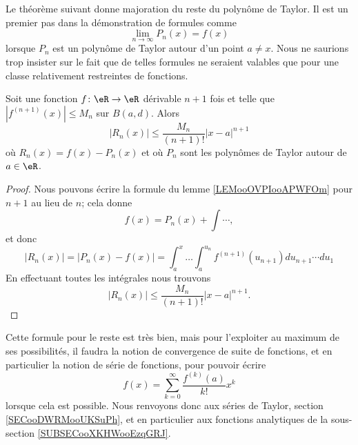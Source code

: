 Le théorème suivant donne majoration du reste du polynôme de Taylor. Il est un premier pas dans la démonstration de formules comme
\begin{equation}
	\lim_{n\to \infty} P_n(x)=f(x)
\end{equation}
lorsque \( P_n\) est un polynôme de Taylor autour d'un point \( a\neq x\). Nous ne saurions trop insister sur le fait que de telles formules ne seraient valables que pour une classe relativement restreintes de fonctions.
\begin{theorem}       \label{THOooEUVEooXZJTRL}
	Soit une fonction \( f\colon \eR\to \eR\) dérivable \( n+1\) fois et telle que \( | f^{(n+1)}(x) |\leq M_n\) sur \( B(a,d)\). Alors
	\begin{equation}
		| R_n(x) |\leq \frac{ M_n }{ (n+1)! }| x-a |^{n+1}
	\end{equation}
	où \( R_n(x)=f(x)-P_n(x)\) et où \( P_n\) sont les polynômes de Taylor autour de \( a\in \eR\).
\end{theorem}

\begin{proof}
	Nous pouvons écrire la formule du lemme \ref{LEMooOVPIooAPWFOm} pour \( n+1\) au lieu de \( n\); cela donne
	\begin{equation}
		f(x)=P_n(x)+\int\cdots,
	\end{equation}
	et donc
	\begin{equation}
		| R_n(x) |=| P_n(x)-f(x) |=\int_a^x\ldots\int_a^{u_n}f^{(n+1)}(u_{n+1})du_{n+1}\cdots du_{1}
	\end{equation}
	En effectuant toutes les intégrales nous trouvons
	\begin{equation}
		| R_n(x) |\leq \frac{ M_n }{ (n+1)! }| x-a |^{n+1}.
	\end{equation}
\end{proof}
Cette formule pour le reste est très bien, mais pour l'exploiter au maximum de ses possibilités, il faudra la notion de convergence de suite de fonctions, et en particulier la notion de série de fonctions, pour pouvoir écrire
\begin{equation}
	f(x)=\sum_{k=0}^{\infty}\frac{ f^{(k)}(a) }{ k! }x^k
\end{equation}
lorsque cela est possible. Nous renvoyons donc aux séries de Taylor, section \ref{SECooDWRMooUKSuPh}, et en particulier aux fonctions analytiques de la sous-section \ref{SUBSECooXKHWooEzqGRJ}.

